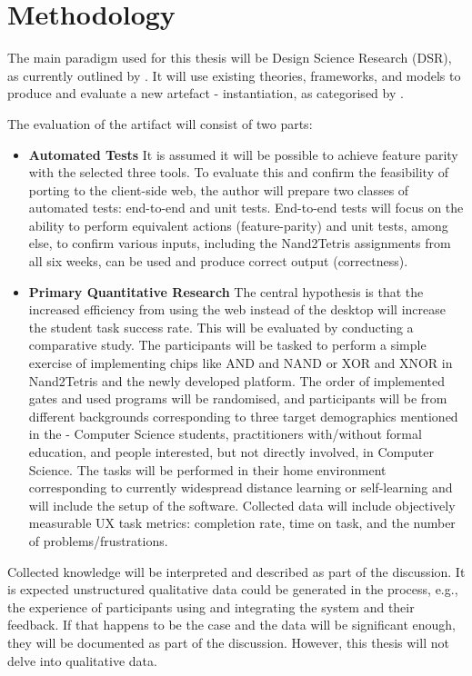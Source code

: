 \chapter{Methodology}

The main paradigm used for this thesis will be Design Science Research (DSR), as currently outlined by .
It will use existing theories, frameworks, and models to produce and evaluate a new artefact - instantiation, as categorised by .

The evaluation of the artifact will consist of two parts:

\begin{itemize}
    \item \textbf{Automated Tests}
    It is assumed it will be possible to achieve feature parity with the selected three tools.
    To evaluate this and confirm the feasibility of porting to the client-side web, the author will prepare two classes of automated tests: end-to-end and unit tests.
    End-to-end tests will focus on the ability to perform equivalent actions (feature-parity) and unit tests, among else, to confirm various inputs, including the Nand2Tetris assignments from all six weeks, can be used and produce correct output (correctness).
    \item \textbf{Primary Quantitative Research}
    The central hypothesis is that the increased efficiency from using the web instead of the desktop will increase the student task success rate.
    This will be evaluated by conducting a comparative study.
    The participants will be tasked to perform a simple exercise of implementing chips like AND and NAND or XOR and XNOR in Nand2Tetris and the newly developed platform.
    The order of implemented gates and used programs will be randomised, and participants will be from different backgrounds corresponding to three target demographics mentioned in the  - Computer Science students, practitioners with/without formal education, and people interested, but not directly involved, in Computer Science.
    The tasks will be performed in their home environment corresponding to currently widespread distance learning or self-learning and will include the setup of the software.
    Collected data will include objectively measurable UX task metrics: completion rate, time on task, and the number of problems/frustrations.
\end{itemize}

Collected knowledge will be interpreted and described as part of the discussion.
It is expected unstructured qualitative data could be generated in the process, e.g., the experience of participants using and integrating the system and their feedback.
If that happens to be the case and the data will be significant enough, they will be documented as part of the discussion. However, this thesis will not delve into qualitative data.
